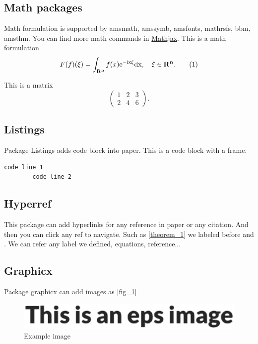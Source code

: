 \documentclass{article}
\begin{document}
    \subsection{Math packages}
    Math formulation is supported by amsmath, amssymb, amsfonts, mathrsfs, bbm, amsthm.
    You can find more math commands in \href{https://thaning0.github.io/2017/12/22/mathjax/}{Mathjax}.
    This is a math formulation
    \begin{align}
        F(f)(\xi)=\int_{\bf{R}^n} f(x)\rm e^{-\rm i x\xi}\rm dx,\quad \xi\in\bf{R}^n. \tag{1}
    \end{align}

    This is a matrix
    $$
    \begin{pmatrix}
        1 & 2 & 3\\
        2 & 4 & 6
    \end{pmatrix}.
    $$
    
    \subsection{Listings}
    Package Listings adds code block into paper.
    This is a code block with a frame.
    \begin{lstlisting}[frame = single]
        code line 1
        code line 2
    \end{lstlisting}

    \subsection{Hyperref}
    This package can add hyperlinks for any reference in paper or any citation. And then you can click any ref to navigate.
    Such as \autoref{theorem_1} we labeled before and \cite{referencekey}. We can refer any label we defined, equations, reference...

    \subsection{Graphicx}
    Package graphicx can add images as \autoref{fig_1}

    \begin{figure}[htbp] %
        \centering %
        \includegraphics[width=\linewidth]{example.eps} 
        \caption{Example image} %
        \label{fig_1}
    \end{figure}
    
\end{document}
